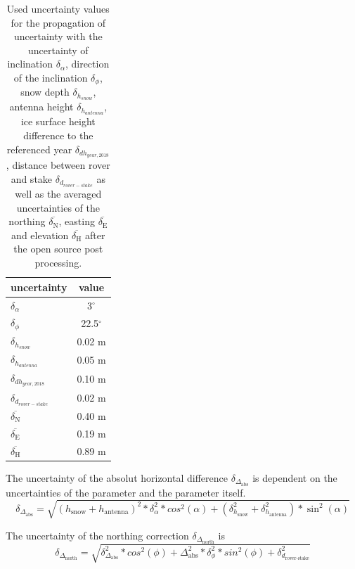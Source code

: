\begin{table}[H]
	\caption{Used uncertainty values for the propagation of uncertainty with the uncertainty of inclination $ \delta_{\alpha} $, direction of the inclination $ \delta_{\phi} $, snow depth $ \delta_{h_{snow}}$, antenna height $ \delta_{h_{antenna}} $, ice surface height difference to the referenced year $ \delta_{dh_{year,2018}}$, distance between rover and stake $ \delta_{d_{rover-stake}} $ as well as the averaged uncertainties of the northing $ \overline{\delta_{\text{N}}} $, easting $ \overline{\delta_{\text{E}}} $ and elevation $ \overline{\delta_{\text{H}}} $ after the open source post processing.}
	\centering
	\begin{tabular}{lc}
	\toprule
        uncertainty &  value \\
	\midrule
    $ \delta_{\alpha} $ &  3$^{\circ}$ \\
    $ \delta_{\phi} $ &  22.5$^{\circ}$ \\
    $ \delta_{h_{snow}}$ &  0.02 m \\
    $ \delta_{h_{antenna}} $ &  0.05 m \\
    $ \delta_{dh_{year,2018}} $ &  0.10 m \\
    $ \delta_{d_{rover-stake}} $ &  0.02 m \\
    $ \overline{\delta_{\text{N}}} $ & 0.40 m \\
    $ \overline{\delta_{\text{E}}} $ & 0.19 m \\
    $ \overline{\delta_{\text{H}}} $ & 0.89 m \\
    \bottomrule
	\end{tabular}
	\label{GPS:tab:errors}
\end{table} 

The uncertainty of the absolut horizontal difference $\delta_{\Delta_{\text{abs}}}$ is dependent on the uncertainties of the parameter and the parameter itself.
\begin{equation}
	\delta_{\Delta_{\text{abs}}} = \sqrt{(h_{\text{snow}} + h_{\text{antenna}})^2 * \delta_{\alpha}^2 * cos^2(\alpha) + (\delta_{h_{\text{snow}}}^2 + \delta_{h_{\text{antenna}}}^2) * \sin^2(\alpha)}
\end{equation}

The uncertainty of the northing correction $\delta_{\Delta_{\text{north}}}$ is
\begin{equation}
	\delta_{\Delta_{\text{north}}} = \sqrt{\delta_{\Delta_{\text{abs}}}^2 * cos^2(\phi) + \Delta_{\text{abs}}^2 * \delta_{\phi}^2 * sin^2(\phi) + \delta_{d_{\text{rover-stake}}}^2}
\end{equation}

